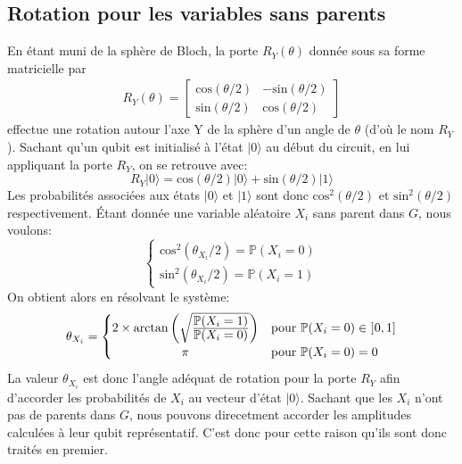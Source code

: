\subsection{Rotation pour les variables sans parents}
\label{calcul_simple_rot}
En étant muni de la sphère de Bloch, la porte $R_Y(\theta)$ donnée sous sa forme matricielle par
\begin{align*}
R_Y(\theta) = 
\begin{bmatrix}
\mathrm{cos}(\theta/2) & -\mathrm{sin}(\theta/2) \\
\mathrm{sin}(\theta/2) & \mathrm{cos}(\theta/2)
\end{bmatrix}
\end{align*}
effectue une rotation autour l'axe Y de la sphère d'un angle de $\theta$ (d'où le nom $R_Y$). 
Sachant qu'un qubit est initialisé à l'état $|0\rangle$ au début du circuit, en lui appliquant la porte $R_Y$, on se retrouve avec:
\[R_Y|0\rangle = \mathrm{cos}(\theta/2)|0\rangle+\mathrm{sin}(\theta/2)|1\rangle\]
Les probabilités associées aux états $|0\rangle$ et $|1\rangle$ sont donc $\mathrm{cos}^2(\theta/2)$ et $\mathrm{sin}^2(\theta/2)$ respectivement. Étant donnée une variable aléatoire $X_i$ sans parent dans $G$, nous voulons:
\[
\begin{cases}
\mathrm{cos}^2(\theta_{X_i}/2) = \mathbb{P}(X_i=0) \\
\mathrm{sin}^2(\theta_{X_i}/2) = \mathbb{P}(X_i=1)
\end{cases}
\]
On obtient alors en résolvant le système:
\[
\theta_{X_i} = 
 \begin{cases}
 2\times\mathrm{arctan}\left(\sqrt{\frac{\displaystyle \mathbb{P}(X_i=1)}{\displaystyle \mathbb{P}(X_i=0)}}\right) & \mathrm{pour} \ \mathbb{P}(X_i=0) \in \ ]0,1] \\
 \hfil \pi & \mathrm{pour} \ \mathbb{P}(X_i=0)=0
 \end{cases}
\]
La valeur $\theta_{X_i}$ est donc l'angle adéquat de rotation pour la porte $R_Y$ afin d'accorder les probabilités de $X_i$ au vecteur d'état $|0\rangle$. Sachant que les $X_i$ n'ont pas de parents dans $G$, nous pouvons direcetment accorder les amplitudes calculées à leur qubit représentatif. C'est donc pour cette raison qu'ils sont donc traités en premier. 

